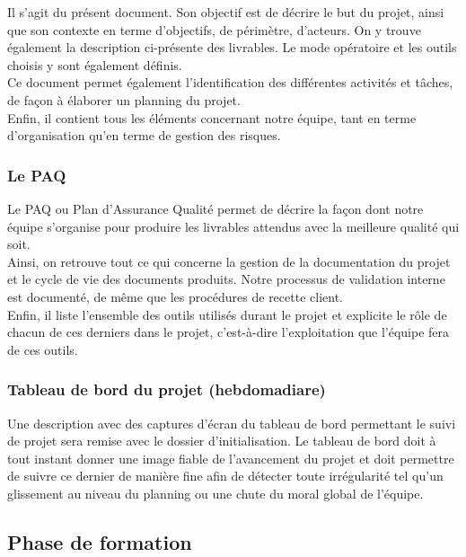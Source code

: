 Il s’agit du présent document. Son objectif est de décrire le but du projet, ainsi que son contexte en terme d’objectifs, de périmètre, d’acteurs. On y trouve également la description ci-présente des livrables. Le mode opératoire et les outils choisis y sont également définis.  \\

Ce document permet également l’identification des différentes activités et tâches, de façon à élaborer un planning du projet. \\

Enfin, il contient tous les éléments concernant notre équipe, tant en terme d’organisation qu’en terme de gestion des risques.

\subsubsection{Le PAQ}

Le PAQ ou Plan d’Assurance Qualité permet de décrire la façon dont notre équipe s’organise pour produire les livrables attendus avec la meilleure qualité qui soit. \\

Ainsi, on retrouve tout ce qui concerne la gestion de la documentation du projet et le cycle de vie des documents produits. Notre processus de validation interne est documenté, de même que les procédures de recette client. \\

Enfin, il liste l’ensemble des outils utilisés durant le projet et explicite le rôle de chacun de ces derniers dans le projet, c’est-à-dire l’exploitation que l’équipe fera de ces outils.

\subsubsection{Tableau de bord du projet (hebdomadiare)}

Une description avec des captures d’écran du tableau de bord permettant le suivi de projet sera remise avec le dossier d’initialisation. Le tableau de bord doit à tout instant donner une image fiable de l’avancement du projet et doit permettre de suivre ce dernier de manière fine afin de détecter toute irrégularité tel qu’un glissement au niveau du planning ou une chute du moral global de l’équipe.

\subsection{Phase de formation}

